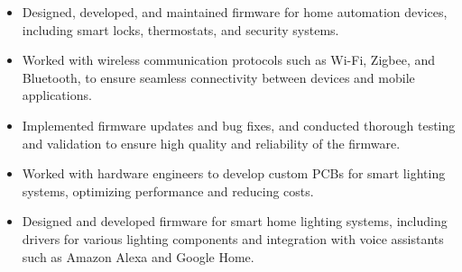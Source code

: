           {\begin{itemize}
              \item Designed, developed, and maintained firmware for home automation devices, including smart locks, thermostats, and security systems.
              \item Worked with wireless communication protocols such as Wi-Fi, Zigbee, and Bluetooth, to ensure seamless connectivity between devices and mobile applications.
              \item Implemented firmware updates and bug fixes, and conducted thorough testing and validation to ensure high quality and reliability of the firmware.
              \item Worked with hardware engineers to develop custom PCBs for smart lighting systems, optimizing performance and reducing costs.
              \item Designed and developed firmware for smart home lighting systems, including drivers for various lighting components and integration with voice assistants such as Amazon Alexa and Google Home.
          \end{itemize}}
      \resumeItemListEnd
    \vspace{-5pt}
    \vspace{-5pt}

  \resumeSubHeadingListEnd
